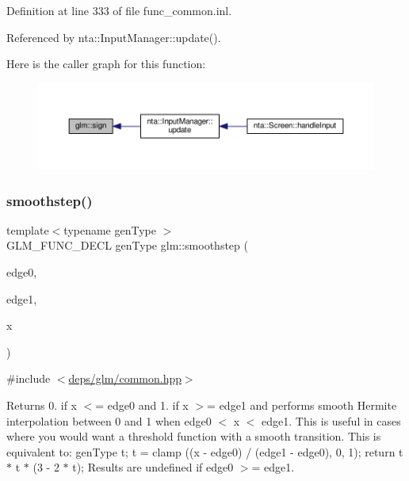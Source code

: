 Definition at line 333 of file func\+\_\+common.\+inl.



Referenced by nta\+::\+Input\+Manager\+::update().

Here is the caller graph for this function\+:
\nopagebreak
\begin{figure}[H]
\begin{center}
\leavevmode
\includegraphics[width=350pt]{d0/de3/group__core__func__common_ga1e2e5cfff800056540e32f6c9b604b28_icgraph}
\end{center}
\end{figure}
\mbox{\label{group__core__func__common_ga562edf7eca082cc5b7a0aaf180436daf}} 
\subsubsection{\texorpdfstring{smoothstep()}{smoothstep()}}
{\footnotesize\ttfamily template$<$typename gen\+Type $>$ \\
G\+L\+M\+\_\+\+F\+U\+N\+C\+\_\+\+D\+E\+CL gen\+Type glm\+::smoothstep (\begin{DoxyParamCaption}\item[{gen\+Type}]{edge0,  }\item[{gen\+Type}]{edge1,  }\item[{gen\+Type}]{x }\end{DoxyParamCaption})}



{\ttfamily \#include $<$\hyperlink{common_8hpp}{deps/glm/common.\+hpp}$>$}

Returns 0. if x $<$= edge0 and 1. if x $>$= edge1 and performs smooth Hermite interpolation between 0 and 1 when edge0 $<$ x $<$ edge1. This is useful in cases where you would want a threshold function with a smooth transition. This is equivalent to\+: gen\+Type t; t = clamp ((x -\/ edge0) / (edge1 -\/ edge0), 0, 1); return t $\ast$ t $\ast$ (3 -\/ 2 $\ast$ t); Results are undefined if edge0 $>$= edge1.


